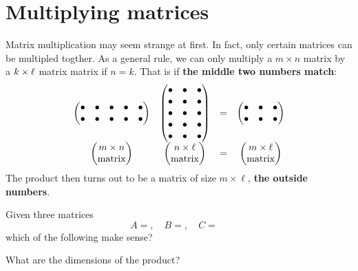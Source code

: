 \documentclass{ximera}
\begin{document}
\section{Multiplying matrices}

Matrix multiplication may seem strange at first. In fact, only certain
matrices can be multipled togther. As a general rule, we can only
multiply a $m \times n$ matrix by a $k \times \ell$ matrix matrix if
$n=k$. That is if \textbf{the middle two numbers match}:
\[
\begin{matrix}
\begin{pmatrix}
    \bullet & \bullet & \bullet & \bullet & \bullet\\
    \bullet & \bullet & \bullet & \bullet & \bullet\\
\end{pmatrix}
&
\begin{pmatrix}
    \bullet & \bullet &\bullet \\\bullet & \bullet & \bullet \\  \bullet & \bullet & \bullet \\\bullet & \bullet & \bullet \\ \bullet & \bullet & \bullet \end{pmatrix} &= &
\begin{pmatrix}
  \bullet & \bullet &\bullet \\\bullet & \bullet &  \bullet
\end{pmatrix}\\
\begin{pmatrix}
  m\times n\\
  \text{matrix}
\end{pmatrix} &
\begin{pmatrix}
  n\times \ell\\
  \text{matrix}
\end{pmatrix} 
&= & \begin{pmatrix}
  m\times \ell\\
  \text{matrix}
\end{pmatrix}
\end{matrix}
\]
The product then turns out to be a matrix of size $m\times \ell$, \textbf{the
outside numbers}.

\begin{question}
  Given three matrices 
  \[
  A =,\quad B =, \quad C =\quad 
  \]
  which of the following make sense?
  \begin{selectAll}
  \end{selectAll}
  What are the dimensions of the product?
\end{question}
\end{document}
